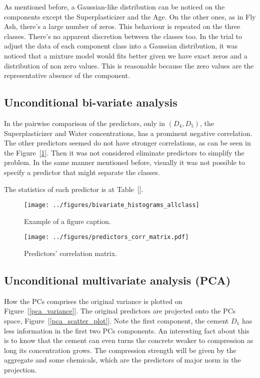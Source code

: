 \documentclass[conference]{IEEEtran}
\begin{document}
As mentioned before, a Gaussian-like distribution can be noticed on the components except the Superplasticizer and the Age. On the other ones, as in Fly Ash, there's a large number of zeros. This behaviour is repeated on the three classes. There's no apparent discretion between the classes too. In the trial to adjust the data of each component class into a Gaussian distribution, it was noticed that a mixture model would fits better given we have exact zeros and a distribution of non zero values. This is reasonable because the zero values are the representative absence of the component.

\subsection{Unconditional bi-variate analysis}

In the pairwise comparison of the predictors, only in $(D_4,D_5)$, the Superplasticizer and Water concentrations, has a prominent negative correlation. The other predictors seemed do not have stronger correlations, as can be seen in the Figure~[\ref{corr_matrix}]. Then it was not considered eliminate predictors to simplify the problem. In the same manner mentioned before, visually it was not possible to specify a predictor that might separate the classes.

The statistics of each predictor is at Table~[].

\begin{figure}[htbp]
\centerline{\texttt{[image: ../figures/bivariate\_histograms\_allclass]}}
\caption{Example of a figure caption.}
\end{figure}

\begin{figure}[htbp]
\centering
\texttt{[image: ../figures/predictors\_corr\_matrix.pdf]}
\caption{Predictors' correlation matrix.}
\label{corr_matrix}
\end{figure}

\subsection{Unconditional multivariate analysis (PCA)}

How the PCs comprises the original variance is plotted on Figure~[\ref{pca_variance}]. The original predictors are projected onto the PCs space, Figure~[\ref{pca_scatter_plot}]. Note the first component, the cement $D_1$ has less information in the first two PCs components. An interesting fact about this is to know that the cement can even turns the concrete weaker to compression as long its concentration grows. The compression strength will be given by the aggregate and some chemicals, which are the predictors of major norm in the projection.
\end{document}
